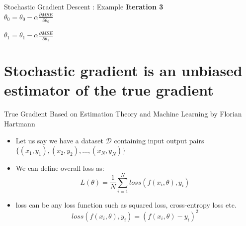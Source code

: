 \documentclass[usenames,dvipsnames]{beamer}
\begin{document}
                        \begin{frame}{Stochastic Gradient Descent : Example}
                        \textbf{Iteration 3}\\
                        \vspace{0.5cm}
                        $\theta_0 = \theta_0 - \alpha\frac{\partial MSE}{\partial \theta_0}$\\ 
                        \vspace{0.5cm}
                        
                        $\theta_1 = \theta_1 - \alpha\frac{\partial MSE}{\partial \theta_1}$\\ 
                        \vspace{0.5cm}
                        \end{frame}
                                       
                        
    \section{Stochastic gradient is an unbiased estimator of the true gradient}


    \begin{frame}{True Gradient}
        Based on Estimation Theory and Machine Learning by Florian Hartmann

        \begin{itemize}[<+->]
            \item Let us say we have a dataset $\mathcal{D}$ containing input output pairs $\{(x_1, y_1), (x_2, y_2), \ldots, (x_N, y_N)\}$
            \item We can define overall loss as:
                $$L(\theta) = \frac{1}{N}\sum_{i=1}^{N}loss(f(x_i, \theta), y_i)$$
            \item loss can be any loss function such as squared loss, cross-entropy loss etc.
            $$loss(f(x_i, \theta), y_i) = (f(x_i, \theta) - y_i)^2$$
        \end{itemize}
    \end{frame}
\end{document}
